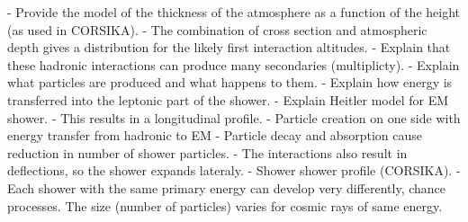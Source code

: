 - Provide the model of the thickness of the atmosphere as a function of the height (as used in CORSIKA).
- The combination of cross section and atmospheric depth gives a distribution for the likely first interaction altitudes.
- Explain that these hadronic interactions can produce many secondaries (multiplicty).
- Explain what particles are produced and what happens to them.
- Explain how energy is transferred into the leptonic part of the shower.
- Explain Heitler model for EM shower.
- This results in a longitudinal profile.
- Particle creation on one side with energy transfer from hadronic to EM
- Particle decay and absorption cause reduction in number of shower particles.
- The interactions also result in deflections, so the shower expands lateraly.
- Shower shower profile (CORSIKA).
- Each shower with the same primary energy can develop very differently, chance processes. The size (number of particles) varies for cosmic rays of same energy.


%
%

